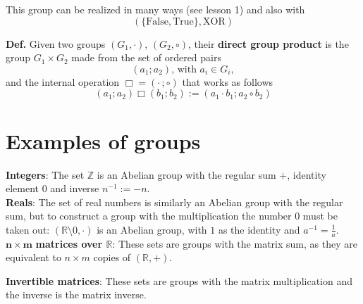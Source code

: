 This group can be realized in many ways (see lesson 1) and also with
$$(\{\text{False},\text{True}\},\text{XOR})$$

\textbf{Def.} Given two groups $(G_1,\cdot)$, $(G_2,\circ)$, their
\textbf{direct group product} is the group $G_1\times G_2$ made from the set of
ordered pairs
$$(a_1;a_2)\text{, with }a_i\in G_i,$$
and the internal operation $\Box = (\cdot\,;\circ)$ that works as follows
$$(a_1;a_2)\Box(b_1;b_2) := (a_1\cdot b_1;a_2\circ b_2)$$
\section{Examples of groups}
\textbf{Integers}:
The set $\mathbb{Z}$ is an Abelian group with the regular sum $+$, identity element
$0$ and inverse $n^{-1}:=-n$.\\

\textbf{Reals}:
The set of real numbers is similarly an Abelian group with the regular sum, but to
construct a group with the multiplication the number $0$ must be taken out:
$(\mathbb{R}\setminus0,\cdot)$ is an Abelian group, with $1$ as the identity and
$a^{-1}=\frac{1}{a}$.\\

$\mathbf{n\times m}$\textbf{ matrices over $\mathbb{R}$}: These sets are groups with
the matrix sum, as they are equivalent to $n\times m$ copies of $(\mathbb{R},+)$.

\textbf{Invertible matrices}: These sets are groups with the matrix multiplication
and the inverse is the matrix inverse.
